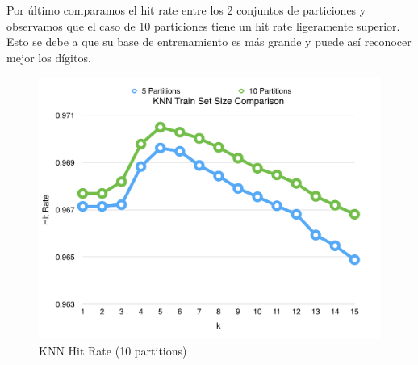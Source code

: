 Por último comparamos el hit rate entre los 2 conjuntos de particiones y observamos que el caso de 10 particiones tiene un hit rate ligeramente superior. Esto se debe a que su base de entrenamiento es más grande y puede así reconocer mejor los dígitos.\\

\begin{figure}[h!]
  \begin{center}
	\includegraphics[scale=0.7]{exp1/KNN-Train-Set-Size.png}
	\caption{KNN Hit Rate (10 partitions)}
  \end{center}
\end{figure}



